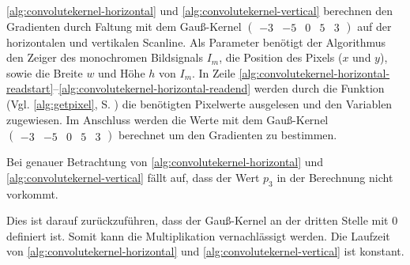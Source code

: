 \autoref{alg:convolutekernel-horizontal} und \autoref{alg:convolutekernel-vertical} berechnen den Gradienten durch Faltung mit dem Gauß-Kernel
$\left( \begin{smallmatrix}
-3& -5& 0& 5& 3
\end{smallmatrix} \right)$
 auf der horizontalen und vertikalen Scanline. Als Parameter benötigt der Algorithmus den Zeiger des monochromen
 Bildsignals $I_m$, die Position des Pixels ($x$ und $y$), sowie die Breite $w$ und Höhe $h$ von $I_m$. In Zeile
 \ref{alg:convolutekernel-horizontal-readstart}--\ref{alg:convolutekernel-horizontal-readend} werden durch die
 Funktion  (Vgl. \autoref{alg:getpixel}, S. \pageref{alg:getpixel}) die benötigten Pixelwerte
 ausgelesen und den Variablen zugewiesen. Im Anschluss werden die Werte mit dem Gauß-Kernel
$\left( \begin{smallmatrix}
-3& -5& 0& 5& 3
\end{smallmatrix} \right)$
berechnet um den Gradienten zu bestimmen.

Bei genauer Betrachtung von \autoref{alg:convolutekernel-horizontal} und \autoref{alg:convolutekernel-vertical}
 fällt auf, dass der Wert $p_3$ in der Berechnung nicht vorkommt.

Dies ist darauf zurückzuführen, dass der Gauß-Kernel an der dritten Stelle mit $0$ definiert ist. Somit kann die
 Multiplikation vernachlässigt werden. Die Laufzeit von \autoref{alg:convolutekernel-horizontal} und
 \autoref{alg:convolutekernel-vertical} ist konstant.

